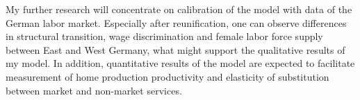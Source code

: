 \documentclass[a4paper,12pt]{article}
\begin{document}
My further research will concentrate on calibration of the model with data of the German labor market. Especially after reunification, one can observe differences in structural transition, wage discrimination and female labor force supply between East and West Germany, what might support the qualitative results of my model. In addition, quantitative results of the model are expected to facilitate measurement of home production productivity and elasticity of substitution between market and non-market services.



\end{document}
